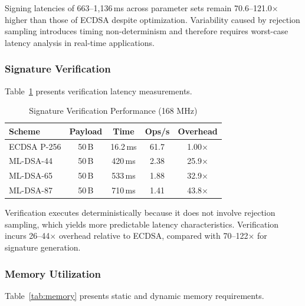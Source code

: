 \documentclass[final, twoside]{IEEEtran} %
\begin{document}
Signing latencies of 663--1,136\,ms across parameter sets remain 70.6--121.0$\times$ higher than those of ECDSA despite optimization. Variability caused by rejection sampling introduces timing non-determinism and therefore requires worst-case latency analysis in real-time applications.

\subsubsection{Signature Verification}

Table~\ref{tab:verify-performance} presents verification latency measurements.

\begin{table}[h]
	\centering
	\caption{Signature Verification Performance (168 MHz)}
	\label{tab:verify-performance}
	\begin{tabular}{lcccc}
		\toprule
		\textbf{Scheme} & \textbf{Payload} & \textbf{Time} & \textbf{Ops/s} & \textbf{Overhead} \\
		\midrule
		ECDSA P-256     & 50\,B            & 16.2\,ms      & 61.7           & 1.00$\times$      \\
		ML-DSA-44       & 50\,B            & 420\,ms       & 2.38           & 25.9$\times$      \\
		ML-DSA-65       & 50\,B            & 533\,ms       & 1.88           & 32.9$\times$      \\
		ML-DSA-87       & 50\,B            & 710\,ms       & 1.41           & 43.8$\times$      \\
		\bottomrule
	\end{tabular}
\end{table}

Verification executes deterministically because it does not involve rejection sampling, which yields more predictable latency characteristics. Verification incurs 26--44$\times$ overhead relative to ECDSA, compared with 70--122$\times$ for signature generation.

\subsubsection{Memory Utilization}

Table~\ref{tab:memory} presents static and dynamic memory requirements.
\end{document}
